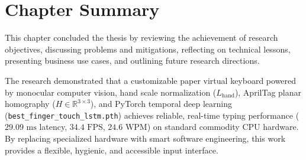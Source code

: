 \section{Chapter Summary}
\label{sec:concl_summary}
This chapter concluded the thesis by reviewing the achievement of research objectives, discussing problems and mitigations, reflecting on technical lessons, presenting business use cases, and outlining future research directions.

The research demonstrated that a customizable paper virtual keyboard powered by monocular computer vision, hand scale normalization ($L_{\text{hand}}$), AprilTag planar homography ($H \in \mathbb{R}^{3 \times 3}$), and PyTorch temporal deep learning (\texttt{best\_finger\_touch\_lstm.pth}) achieves reliable, real-time typing performance ($29.09\text{ ms}$ latency, $34.4\text{ FPS}$, $24.6\text{ WPM}$) on standard commodity CPU hardware. By replacing specialized hardware with smart software engineering, this work provides a flexible, hygienic, and accessible input interface.
